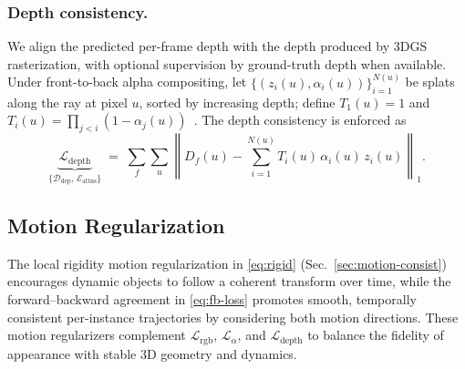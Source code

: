 \subsubsection{Depth consistency.}
We align the predicted per-frame depth with the depth produced by 3DGS rasterization, with optional supervision by ground-truth depth when available. Under front-to-back alpha compositing, let $\{(z_{i}(u),\alpha_{i}(u))\}_{i=1}^{N(u)}$ be splats along the ray at pixel $u$, sorted by increasing depth; define $T_{1}(u)=1$ and $T_{i}(u)=\prod_{j< i}(1-\alpha_{j}(u))$~\cite{kerbl3Dgaussians}. The depth consistency is enforced as
\begin{equation}
\underbrace{\mathcal{L}_{\text{depth}}}_{\{\mathcal{D}_{\text{dep}},\,\mathcal{E}_{\text{attns}}\}}
\;=\;
\sum_{f}\sum_{u}\left\| D_f(u) - \sum_{i=1}^{N(u)} T_{i}(u)\,\alpha_{i}(u)\,z_{i}(u) \right\|_1.
\label{eq:depth-consistency}
\end{equation}

\subsection{Motion Regularization}\label{sec:train-motion}
The local rigidity motion regularization in \eqref{eq:rigid} (Sec.~\ref{sec:motion-consist}) encourages dynamic objects to follow a coherent transform over time, while the forward–backward agreement in \eqref{eq:fb-loss} promotes smooth, temporally consistent per-instance trajectories by considering both motion directions. These motion regularizers complement $\mathcal{L}_{\text{rgb}}$, $\mathcal{L}_{\alpha}$, and $\mathcal{L}_{\text{depth}}$ to balance the fidelity of appearance with stable 3D geometry and dynamics.
